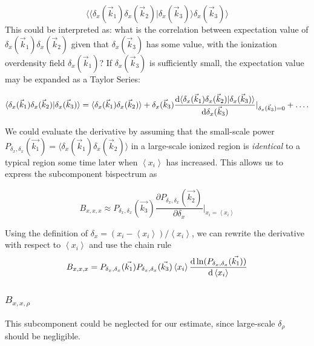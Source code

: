 \begin{equation}
\langle \langle \delta_x(\vec{k}_1)\delta_x(\vec{k}_2) | \delta_x(\vec{k}_3)\rangle \delta_x(\vec{k}_3) \rangle
\end{equation}
This could be interpreted as: what is the correlation between expectation value of $\delta_x(\vec{k}_1)\delta_x(\vec{k}_2)$ given that $\delta_x(\vec{k}_3)$ has some value, with the ionization overdensity field $\delta_x(\vec{k}_1)$? If $\delta_x(\vec{k}_3)$ is sufficiently small, the expectation value may be expanded as a Taylor Series:

\begin{equation}
\langle \delta_x(\vec{k}_1)\delta_x(\vec{k}_2) | \delta_x(\vec{k}_3)\rangle =
\langle \delta_x(\vec{k}_1)\delta_x(\vec{k}_2) \rangle + 
\delta_x(\vec{k}_3) \frac{{\rm d}\langle\delta_x(\vec{k}_1)\delta_x(\vec{k}_2) | \delta_x(\vec{k}_3)\rangle}{{\rm d}\delta_x(\vec{k}_3)}|_{\delta_x(\vec{k}_3)=0} + \ldots.
\end{equation}

We could evaluate the derivative by assuming that the small-scale power $P_{\delta_x,\delta_x}(\vec{k_1}) = \langle \delta_x(\vec{k}_1)\delta_x(\vec{k}_2) \rangle$ in a large-scale ionized region is \textit{identical} to a typical region some time later when $\left\langle x_i \right\rangle$ has increased. This allows us to express the subcomponent bispectrum as 

\begin{equation}
B_{x,x,x} \approx P_{\delta_x,\delta_x}(\vec{k_3}) \frac{\partial P_{\delta_x,\delta_x}(\vec{k_2}) }{\partial\delta_x}|_{x_i = \left\langle x_i \right\rangle}
\end{equation}

Using the definition of $\delta_x = (x_i - \left\langle x_i \right\rangle)/\left\langle x_i \right\rangle$, we can rewrite the derivative with respect to $\left\langle x_i \right\rangle$ and use the chain rule
\begin{equation}
B_{x,x,x} = P_{\delta_x,\delta_x}(\vec{k_1}) P_{\delta_x,\delta_x}(\vec{k_3}) \left\langle x_i \right\rangle \frac{{\rm d} \ln (P_{\delta_x,\delta_x}(\vec{k_1}))}{{\rm d}\left\langle x_i \right\rangle}
\end{equation}

\subsubsection*{$B_{x,x,\rho}$}
\label{subsubsec:Bxxrho}
This subcomponent could be neglected for our estimate, since large-scale $\delta_{\rho}$ should be negligible.

